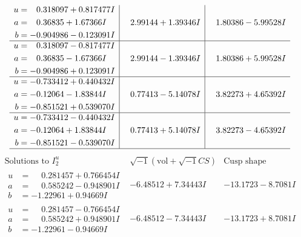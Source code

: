 \documentclass[1p]{elsarticle_modified}
\theoremstyle{definition}
\newcommand{\I}{\sqrt{-1}}
\begin{document}
$$\begin{array}{c|c|c}
\begin{aligned}
u &= \phantom{-}0.318097 + 0.817477 I \\
a &= \phantom{-}0.36835 + 1.67366 I \\
b &= -0.904986 - 0.123091 I\end{aligned}
 & \phantom{-}2.99144 + 1.39346 I & \phantom{-}1.80386 - 5.99528 I \\ \hline\begin{aligned}
u &= \phantom{-}0.318097 - 0.817477 I \\
a &= \phantom{-}0.36835 - 1.67366 I \\
b &= -0.904986 + 0.123091 I\end{aligned}
 & \phantom{-}2.99144 - 1.39346 I & \phantom{-}1.80386 + 5.99528 I \\ \hline\begin{aligned}
u &= -0.733412 + 0.440432 I \\
a &= -0.12064 - 1.83844 I \\
b &= -0.851521 + 0.539070 I\end{aligned}
 & \phantom{-}0.77413 - 5.14078 I & \phantom{-}3.82273 + 4.65392 I \\ \hline\begin{aligned}
u &= -0.733412 - 0.440432 I \\
a &= -0.12064 + 1.83844 I \\
b &= -0.851521 - 0.539070 I\end{aligned}
 & \phantom{-}0.77413 + 5.14078 I & \phantom{-}3.82273 - 4.65392 I\\
 \hline 
 \end{array}$$\newpage$$\begin{array}{c|c|c}  
\text{Solutions to }I^u_{2}& \I (\text{vol} + \sqrt{-1}CS) & \text{Cusp shape}\\
 \hline 
\begin{aligned}
u &= \phantom{-}0.281457 + 0.766454 I \\
a &= \phantom{-}0.585242 - 0.948901 I \\
b &= -1.22961 + 0.94669 I\end{aligned}
 & -6.48512 + 7.34443 I & -13.1723 - 8.7081 I \\ \hline\begin{aligned}
u &= \phantom{-}0.281457 - 0.766454 I \\
a &= \phantom{-}0.585242 + 0.948901 I \\
b &= -1.22961 - 0.94669 I\end{aligned}
 & -6.48512 - 7.34443 I & -13.1723 + 8.7081 I \\ \hline\begin{aligned}

\end{aligned}
\end{array}$$
\end{document}
